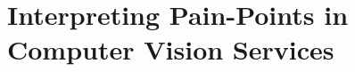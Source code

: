 \chapter[Interpreting Pain-Points in Computer Vision Services]
{Interpreting Pain-Points in Computer Vision Services}
\label{ch:icse2020}
\graphicspath{{mainmatter/publications/figures/icse2020/}}
\def\tablepath{mainmatter/publications/tables/icse2020}

\def\NumPostsFromSO{1,425}	
\def\NumPostsCategorised{1,825}	
\def\NumPostsFromFiftyClassified{380}	
\def\NumPostsFromFiftyNoise{70}	
\def\NumPostsNoise{238}	\def\PctPostsNoise{13.04\%}
	
\def\NumTaxACategorised{188}	\def\PctTaxACategorised{10.30\%}
\def\NumTaxBCategorised{1,579}	\def\PctTaxBCategorised{86.52\%}
\def\NumTaxAUnCategorised{1,410}	\def\PctTaxAUnCategorised{77.26\%}
\def\NumTaxBUnCategorised{19}	\def\PctTaxBUnCategorised{1.04\%}
	
\def\PctTaxACorrectness{22.87\%}
\def\PctTaxACompleteness{47.87\%}
\def\PctTaxADocumentation{23.94\%}
\def\PctTaxBAPIUsage{22.29\%}	
\def\PctTaxBDiscrepancy{16.34\%}	
\def\PctTaxBErrors{32.05\%}	
\def\PctTaxBReview{15.14\%}	
\def\PctTaxBConceptual{11.02\%}	
\def\PctTaxBAPIChange{1.08\%}	
\def\PctTaxBLearning{2.09\%}

\newcommand{\solink}[1]{~\citepweb{SOLink:#1}}

\glsresetall

